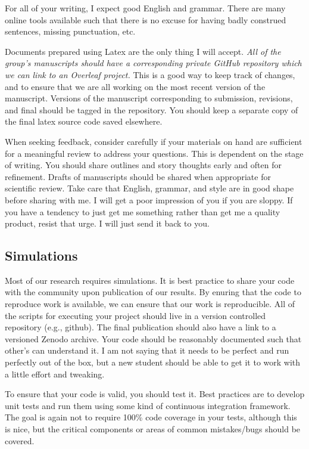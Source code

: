 \documentclass[12pt]{article}
\begin{document}
For all of your writing, I expect good English and grammar.
There are many online tools available such that there is no excuse for having badly construed sentences, missing punctuation, etc.

Documents prepared using Latex are the only thing I will accept.
\emph{All of the group's manuscripts should have a corresponding private GitHub repository which we can link to an Overleaf project.}
This is a good way to keep track of changes, and to ensure that we are all working on the most recent version of the manuscript.
Versions of the manuscript corresponding to submission, revisions, and final should be tagged in the repository.
You should keep a separate copy of the final latex source code saved elsewhere.

When seeking feedback, consider carefully if your materials on hand are sufficient for a meaningful review to address your questions.
This is dependent on the stage of writing.
You should share outlines and story thoughts early and often for refinement.
Drafts of manuscripts should be shared when appropriate for scientific review.
Take care that English, grammar, and style are in good shape before sharing with me.
I will get a poor impression of you if you are sloppy.
If you have a tendency to just get me something rather than get me a quality product, resist that urge.
I will just send it back to you.

\subsection{Simulations}

Most of our research requires simulations.
It is best practice to share your code with the community upon publication of our results.
By enuring that the code to reproduce work is available, we can ensure that our work is reproducible.
All of the scripts for executing your project should live in a version controlled repository (e.g., github).
The final publication should also have a link to a versioned Zenodo archive.
Your code should be reasonably documented such that other's can understand it.
I am not saying that it needs to be perfect and run perfectly out of the box, but a new student should be able to get it to work with a little effort and tweaking.

To ensure that your code is valid, you should test it.
Best practices are to develop unit tests and run them using some kind of continuous integration framework.
The goal is again not to require 100\% code coverage in your tests, although this is nice, but the critical components or areas of common mistakes/bugs should be covered.
\end{document}
